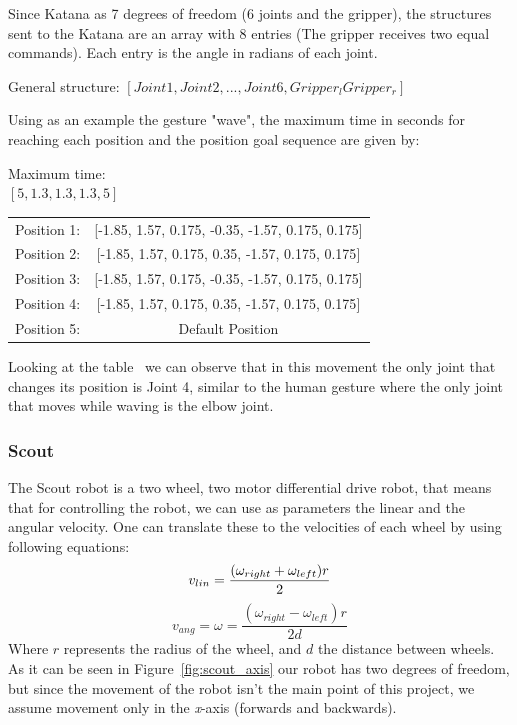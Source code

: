Since Katana as 7 degrees of freedom (6 joints and the gripper), the structures sent to the Katana are an array with 8 entries (The gripper receives two equal commands). Each entry is the angle in radians of each joint.

\begin{center}
General structure:
$\left[ Joint1, Joint2, ... , Joint6, Gripper_l Gripper_r\right]$
\end{center}

Using as an example the gesture "wave", the maximum time in seconds for reaching each position and the position goal sequence are given by:

\begin{center}
Maximum time: \\
$\left[5, 1.3, 1.3, 1.3, 5\right]$
\end{center}

\begin{table}[!ht]
\centering
\begin{tabular}{lc}
Position 1: & {[}-1.85, 1.57, 0.175, -0.35, -1.57, 0.175, 0.175{]} \\
Position 2: & {[}-1.85, 1.57, 0.175,  0.35, -1.57, 0.175, 0.175{]}  \\
Position 3: & {[}-1.85, 1.57, 0.175, -0.35, -1.57, 0.175, 0.175{]} \\
Position 4: & {[}-1.85, 1.57, 0.175,  0.35, -1.57, 0.175, 0.175{]}  \\
Position 5: & Default Position                                    
\end{tabular}
\end{table}

Looking at the table~ we can observe that in this movement the only joint that changes its position is Joint 4, similar to the human gesture where the only joint that moves while waving is the elbow joint.

\subsubsection{Scout}
The Scout robot is a two wheel, two motor differential drive robot, that means that for controlling the robot, we can use as parameters the linear and the angular velocity. One can translate these to the velocities of each wheel by using following equations:
\begin{equation}
v_{lin} = \frac{(\omega_{right}+\omega_{left})r}{2} \\
\end{equation}
\begin{equation}
v_{ang} = \omega = \frac{(\omega_{right}-\omega_{left})r}{2d}
\end{equation}
Where $r$ represents the radius of the wheel, and $d$ the distance between wheels.
As it can be seen in Figure~\ref{fig:scout_axis} our robot has two degrees of freedom, but since the movement of the robot isn't the main point of this project, we assume movement only in the \textit{x}-axis (forwards and backwards).

